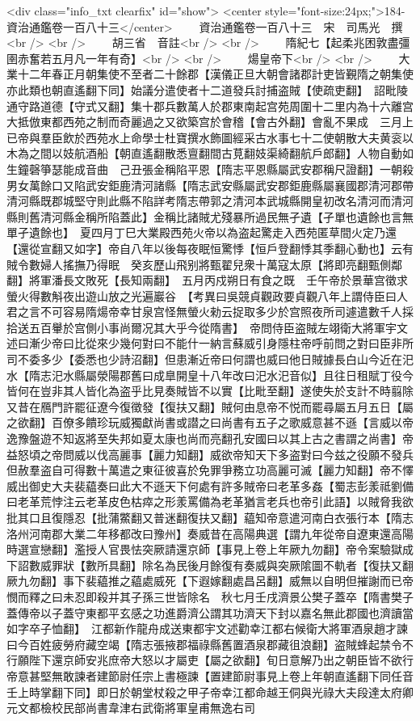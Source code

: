 <div class="info_txt clearfix" id="show">
<center style="font-size:24px;">184-資治通鑑卷一百八十三</center>
  　　資治通鑑卷一百八十三　宋　司馬光　撰<br />
<br />
　　胡三省　音註<br />
<br />
　　隋紀七【起柔兆困敦盡彊圉赤奮若五月凡一年有奇】<br />
<br />
　　煬皇帝下<br />
<br />
　　大業十二年春正月朝集使不至者二十餘郡【漢儀正旦大朝會諸郡計吏皆覲隋之朝集使亦此類也朝直遙翻下同】始議分遣使者十二道發兵討捕盗賊【使疏吏翻】　詔毗陵通守路道德【守式又翻】集十郡兵數萬人於郡東南起宫苑周圍十二里内為十六離宫大抵倣東都西苑之制而奇麗過之又欲築宫於會稽【會古外翻】會亂不果成　三月上已帝與羣臣飲於西苑水上命學士杜寶撰水飾圖經采古水事七十二使朝散大夫黄衮以木為之間以妓航酒船【朝直遙翻散悉亶翻間古莧翻妓渠綺翻航戶郎翻】人物自動如生鐘磬箏瑟能成音曲　己丑張金稱陷平恩【隋志平恩縣屬武安郡稱尺證翻】一朝殺男女萬餘口又陷武安鉅鹿清河諸縣【隋志武安縣屬武安郡鉅鹿縣屬襄國郡清河郡帶清河縣既郡城堅守則此縣不陷詳考隋志帶郭之清河本武城縣開皇初改名清河而清河縣則舊清河縣金稱所陷蓋此】金稱比諸賊尤殘暴所過民無孑遺【孑單也遺餘也言無單孑遺餘也】　夏四月丁巳大業殿西苑火帝以為盗起驚走入西苑匿草間火定乃還【還從宣翻又如字】帝自八年以後每夜眠恒驚悸【恒戶登翻悸其季翻心動也】云有賊令數婦人搖撫乃得眠　癸亥歷山飛别將甄翟兒衆十萬寇太原【將即亮翻甄側鄰翻】將軍潘長文敗死【長知兩翻】　五月丙戍朔日有食之既　壬午帝於景華宫徵求螢火得數斛夜出遊山放之光遍巖谷　【考異曰吳競貞觀政要貞觀八年上謂侍臣曰人君之言不可容易隋煬帝幸甘泉宫怪無螢火勑云捉取多少於宫照夜所司遽遣數千人採拾送五百轝於宫側小事尚爾况其大乎今從隋書】　帝問侍臣盗賊左翊衛大將軍宇文述曰漸少帝曰比從來少幾何對曰不能什一納言蘇威引身隱柱帝呼前問之對曰臣非所司不委多少【委悉也少詩沼翻】但患漸近帝曰何謂也威曰他日賊據長白山今近在汜水【隋志汜水縣屬滎陽郡舊曰成臯開皇十八年改曰汜水汜音似】且往日租賦丁役今皆何在豈非其人皆化為盗乎比見奏賊皆不以實【比毗至翻】遂使失於支計不時翦除又昔在鴈門許罷征遼今復徵發【復扶又翻】賊何由息帝不悦而罷尋屬五月五日【屬之欲翻】百僚多饋珍玩威獨獻尚書或譛之曰尚書有五子之歌威意甚不遜【言威以帝逸豫盤遊不知返將至失邦如夏太康也尚而亮翻孔安國曰以其上古之書謂之尚書】帝益怒頃之帝問威以伐高麗事【麗力知翻】威欲帝知天下多盗對曰今兹之役願不發兵但赦羣盗自可得數十萬遣之東征彼喜於免罪爭務立功高麗可滅【麗力知翻】帝不懌威出御史大夫裴藴奏曰此大不遜天下何處有許多賊帝曰老革多姦【蜀志彭羕祗劉備曰老革荒悖注云老革皮色枯瘁之形羕罵備為老革猶言老兵也帝引此語】以賊脅我欲批其口且復隱忍【批蒲鱉翻又普迷翻復扶又翻】藴知帝意遣河南白衣張行本【隋志洛州河南郡大業二年移都改曰豫州】奏威昔在高陽典選【謂九年從帝自遼東還高陽時選宣戀翻】濫授人官畏怯突厥請還京師【事見上卷上年厥九勿翻】帝令案驗獄成下詔數威罪狀【數所具翻】除名為民後月餘復有奏威與突厥隂圖不軌者【復扶又翻厥九勿翻】事下裴藴推之藴處威死【下遐嫁翻處昌呂翻】威無以自明但摧謝而已帝憫而釋之曰未忍即殺并其子孫三世皆除名　秋七月壬戌濟景公樊子蓋卒【隋書樊子蓋傳帝以子蓋守東都平玄感之功進爵濟公謂其功濟天下封以嘉名無此郡國也濟讀當如字卒子恤翻】　江都新作龍舟成送東都宇文述勸幸江都右候衛大將軍酒泉趙才諫曰今百姓疲勞府藏空竭【隋志張掖郡福祿縣舊置酒泉郡藏徂浪翻】盗賊蜂起禁令不行願陛下還京師安兆庶帝大怒以才屬吏【屬之欲翻】旬日意解乃出之朝臣皆不欲行帝意甚堅無敢諫者建節尉任宗上書極諫【置建節尉事見上卷上年朝直遙翻下同任音壬上時掌翻下同】即日於朝堂杖殺之甲子帝幸江都命越王侗與光祿大夫段達太府卿元文都檢校民部尚書韋津右武衛將軍皇甫無逸右司
